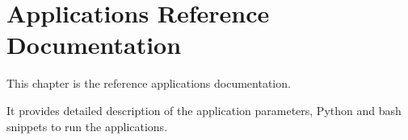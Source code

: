 \chapter{Applications Reference Documentation}\label{chap:apprefdoc}

This chapter is the reference applications documentation.

It provides detailed description of the application parameters, Python and bash snippets
to run the applications.


